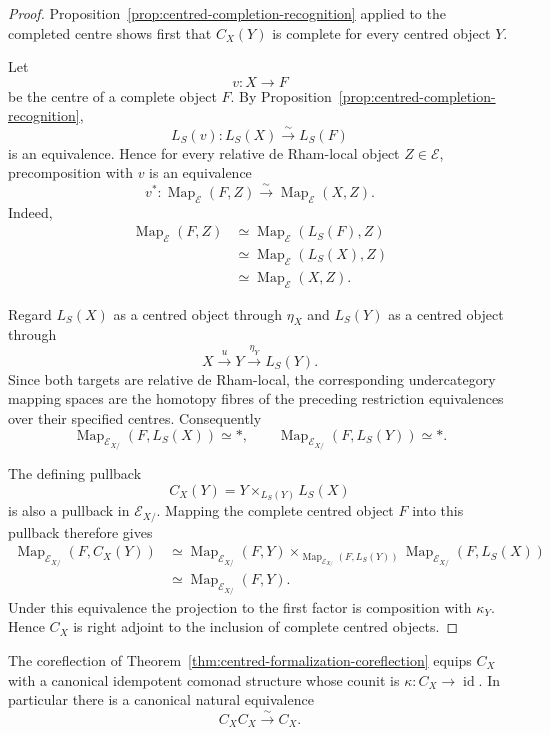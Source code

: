 \begin{proof}
Proposition~\ref{prop:centred-completion-recognition} applied to the completed
centre shows first that $C_X(Y)$ is complete for every centred object $Y$.

Let
\[
    v:X\longrightarrow F
\]
be the centre of a complete object $F$.  By
Proposition~\ref{prop:centred-completion-recognition},
\[
    L_S(v):L_S(X)\xrightarrow{\sim}L_S(F)
\]
is an equivalence.  Hence for every relative de Rham-local object
$Z\in\mathcal E$, precomposition with $v$ is an equivalence
\[
    v^*:
    \operatorname{Map}_{\mathcal E}(F,Z)
    \xrightarrow{\sim}
    \operatorname{Map}_{\mathcal E}(X,Z).
\]
Indeed,
\[
\begin{aligned}
    \operatorname{Map}_{\mathcal E}(F,Z)
    &\simeq
    \operatorname{Map}_{\mathcal E}(L_S(F),Z)\\
    &\simeq
    \operatorname{Map}_{\mathcal E}(L_S(X),Z)\\
    &\simeq
    \operatorname{Map}_{\mathcal E}(X,Z).
\end{aligned}
\]

Regard $L_S(X)$ as a centred object through $\eta_X$ and
$L_S(Y)$ as a centred object through
\[
    X\xrightarrow{u}Y\xrightarrow{\eta_Y}L_S(Y).
\]
Since both targets are relative de Rham-local, the corresponding
undercategory mapping spaces are the homotopy fibres of the preceding
restriction equivalences over their specified centres.  Consequently
\[
    \operatorname{Map}_{\mathcal E_{X/}}(F,L_S(X))
    \simeq *,
    \qquad
    \operatorname{Map}_{\mathcal E_{X/}}(F,L_S(Y))
    \simeq *.
\]

The defining pullback
\[
    C_X(Y)
    =
    Y\times_{L_S(Y)}L_S(X)
\]
is also a pullback in $\mathcal E_{X/}$.  Mapping the complete centred object
$F$ into this pullback therefore gives
\[
\begin{aligned}
    \operatorname{Map}_{\mathcal E_{X/}}(F,C_X(Y))
    &\simeq
    \operatorname{Map}_{\mathcal E_{X/}}(F,Y)
    \times_{\operatorname{Map}_{\mathcal E_{X/}}(F,L_S(Y))}
    \operatorname{Map}_{\mathcal E_{X/}}(F,L_S(X))\\
    &\simeq
    \operatorname{Map}_{\mathcal E_{X/}}(F,Y).
\end{aligned}
\]
Under this equivalence the projection to the first factor is composition with
$\kappa_Y$.  Hence $C_X$ is right adjoint to the inclusion of complete
centred objects.
\end{proof}


\begin{theorem}
\label{thm:centred-completion-idempotent}
The coreflection of
Theorem~\ref{thm:centred-formalization-coreflection} equips $C_X$ with a
canonical idempotent comonad structure whose counit is
$\kappa:C_X\to\operatorname{id}$.  In particular there is a canonical natural
equivalence
\[
    C_XC_X
    \xrightarrow{\sim}
    C_X.
\]
\end{theorem}


